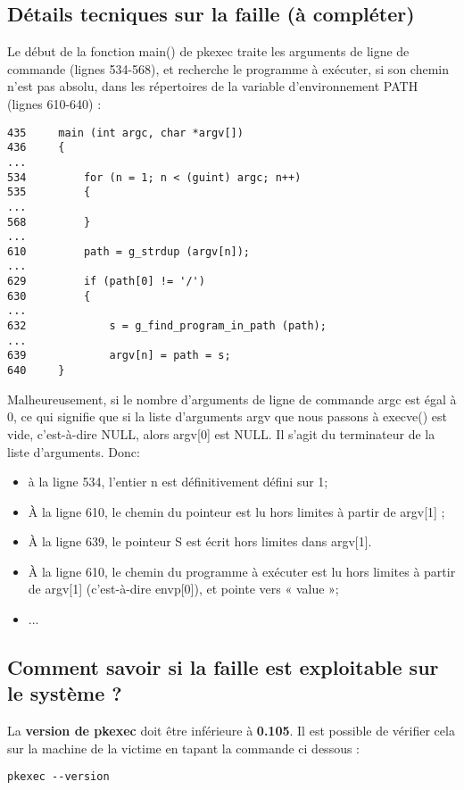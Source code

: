 \documentclass[a4paper, 12pt]{article}
\begin{document}
   		\subsection{Détails tecniques sur la faille (à compléter) }
   		\begin{flushleft}
   			\noindent Le début de la fonction main() de pkexec traite les arguments de ligne de commande (lignes 534-568), et recherche le programme à exécuter, si son chemin n’est pas absolu, dans les répertoires de la variable d’environnement PATH (lignes 610-640) :
   			\begin{lstlisting}
435 	main (int argc, char *argv[])
436 	{
...
534 		for (n = 1; n < (guint) argc; n++)
535     	{
...
568     	}
...
610   		path = g_strdup (argv[n]);
...
629   		if (path[0] != '/')
630     	{
...
632     		s = g_find_program_in_path (path);
...
639       		argv[n] = path = s;
640     }
        	\end{lstlisting}
        	\item Malheureusement, si le nombre d’arguments de ligne de commande argc est égal à 0, ce qui signifie que si la liste d’arguments argv que nous passons à execve() est vide, c’est-à-dire {NULL}, alors argv[0] est NULL. Il s’agit du terminateur de la liste d’arguments. Donc:
        	\begin{itemize}
        		\item à la ligne 534, l’entier n est définitivement défini sur 1;
        		\item À la ligne 610, le chemin du pointeur est lu hors limites à partir de argv[1] ;
        		\item À la ligne 639, le pointeur S est écrit hors limites dans argv[1].
        		\item À la ligne 610, le chemin du programme à exécuter est lu hors limites à partir de argv[1] (c’est-à-dire envp[0]), et pointe vers « value »;
        		\item ...
        	\end{itemize}
        	
   		\end{flushleft}
   		\subsection{Comment savoir si la faille est exploitable sur le système ?}
   		La \textbf{version de pkexec} doit être inférieure à \textbf{0.105}. Il est possible de vérifier cela sur la machine de la victime en tapant la commande ci dessous : 
\begin{lstlisting}
pkexec --version
\end{lstlisting}
\end{document}

